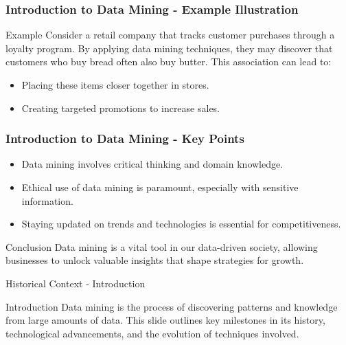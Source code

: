 \documentclass[aspectratio=169]{beamer}
\begin{document}
\begin{frame}[fragile]
    \frametitle{Introduction to Data Mining - Example Illustration}
    \begin{block}{Example}
        Consider a retail company that tracks customer purchases through a loyalty program. By applying data mining techniques, they may discover that customers who buy bread often also buy butter. This association can lead to:
        \begin{itemize}
            \item Placing these items closer together in stores.
            \item Creating targeted promotions to increase sales.
        \end{itemize}
    \end{block}
\end{frame}

\begin{frame}[fragile]
    \frametitle{Introduction to Data Mining - Key Points}
    \begin{itemize}
        \item Data mining involves critical thinking and domain knowledge.
        \item Ethical use of data mining is paramount, especially with sensitive information.
        \item Staying updated on trends and technologies is essential for competitiveness.
    \end{itemize}
    
    \begin{block}{Conclusion}
        Data mining is a vital tool in our data-driven society, allowing businesses to unlock valuable insights that shape strategies for growth.
    \end{block}
\end{frame}

\begin{frame}[fragile]{Historical Context - Introduction}
    \begin{block}{Introduction}
        Data mining is the process of discovering patterns and knowledge from large amounts of data. This slide outlines key milestones in its history, technological advancements, and the evolution of techniques involved.
    \end{block}
\end{frame}
\end{document}
